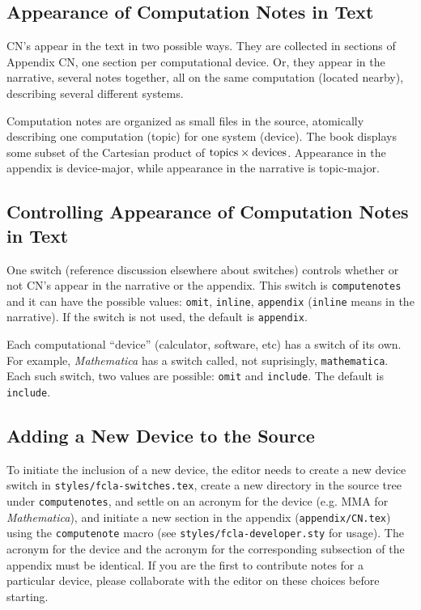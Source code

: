 \documentclass[12pt]{article}
\newcommand{\sourcefile}[1]{{\tt#1}}
\newcommand{\rawtex}[1]{{\tt#1}}
\newcommand{\acronymref}[2]{\MakeUppercase#1 #2}
\begin{document}
\subsection*{Appearance of Computation Notes in Text}
%
CN's appear in the text in two possible ways.  They are collected in sections of \acronymref{appendix}{CN}, one section per computational device.  Or, they appear in the narrative, several notes together, all on the same computation (located nearby), describing several different systems.\par
%
Computation notes are organized as small files in the source, atomically describing one computation (topic) for one system (device).  The book displays some subset of the Cartesian product of ${\rm topics}\times {\rm devices}$.  Appearance in the appendix is device-major, while appearance in the narrative is topic-major.
%
\subsection*{Controlling Appearance of Computation Notes in Text}
%
One switch (reference discussion elsewhere about switches) controls whether or not CN's appear in the narrative or the appendix.  This switch is \rawtex{computenotes} and it can have the possible values: \rawtex{omit}, \rawtex{inline}, \rawtex{appendix} (\rawtex{inline} means in the narrative).  If the switch is not used, the default is \rawtex{appendix}.\par
%
Each computational ``device'' (calculator, software, etc) has a switch of its own.  For example, {\sl Mathematica} has a switch called, not suprisingly, \rawtex{mathematica}.  Each such switch, two values are possible: \rawtex{omit} and \rawtex{include}.  The default is \rawtex{include}.
%
\subsection*{Adding a New Device to the Source}
%
To initiate the inclusion of a new device, the editor needs to create a new device switch in \sourcefile{styles/fcla-switches.tex}, create a new directory in the source tree under \sourcefile{computenotes}, and settle on an acronym for the device (e.g. MMA for {\sl Mathematica}), and initiate a new section in the appendix (\sourcefile{appendix/CN.tex}) using the \rawtex{computenote} macro (see \sourcefile{styles/fcla-developer.sty} for usage).  The acronym for the device and the acronym for the corresponding subsection of the appendix must be identical.  If you are the first to contribute notes for a particular device, please collaborate with the editor on these choices before starting.\par
%
\end{document}
